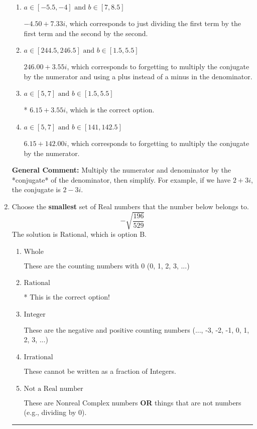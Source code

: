 \documentclass{extbook}[14pt]
\newcommand{\litem}[1]{\item #1

\rule{\textwidth}{0.4pt}}
\begin{document}
\begin{enumerate}
{\begin{enumerate}[label=\Alph*.]
 $-7.05  + 0.85 i$, which corresponds to forgetting to multiply the conjugate by the numerator and not computing the conjugate correctly.
\item \( a \in [-5.5, -4] \text{ and } b \in [7, 8.5] \)

 $-4.50  + 7.33 i$, which corresponds to just dividing the first term by the first term and the second by the second.
\item \( a \in [244.5, 246.5] \text{ and } b \in [1.5, 5.5] \)

 $246.00  + 3.55 i$, which corresponds to forgetting to multiply the conjugate by the numerator and using a plus instead of a minus in the denominator.
\item \( a \in [5, 7] \text{ and } b \in [1.5, 5.5] \)

* $6.15  + 3.55 i$, which is the correct option.
\item \( a \in [5, 7] \text{ and } b \in [141, 142.5] \)

 $6.15  + 142.00 i$, which corresponds to forgetting to multiply the conjugate by the numerator.
\end{enumerate}

\textbf{General Comment:} Multiply the numerator and denominator by the *conjugate* of the denominator, then simplify. For example, if we have $2+3i$, the conjugate is $2-3i$.
}
\litem{
Choose the \textbf{smallest} set of Real numbers that the number below belongs to.
\[ -\sqrt{\frac{196}{529}} \]The solution is \( \text{Rational} \), which is option B.\begin{enumerate}[label=\Alph*.]
\item \( \text{Whole} \)

These are the counting numbers with 0 (0, 1, 2, 3, ...)
\item \( \text{Rational} \)

* This is the correct option!
\item \( \text{Integer} \)

These are the negative and positive counting numbers (..., -3, -2, -1, 0, 1, 2, 3, ...)
\item \( \text{Irrational} \)

These cannot be written as a fraction of Integers.
\item \( \text{Not a Real number} \)

These are Nonreal Complex numbers \textbf{OR} things that are not numbers (e.g., dividing by 0).
\end{enumerate}

}
\end{enumerate}
\end{document}
